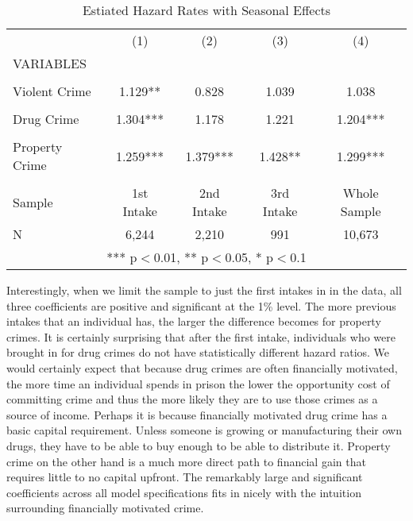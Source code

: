 \documentclass{article}
\begin{document}
\vspace{.25in}

\begin{table}[h!]
    \centering
\begin{tabular}{lcccc} \hline
 & (1) & (2) & (3) & (4) \\
VARIABLES &  &  &  &  \\ \hline
 &  &  &  &  \\
Violent Crime & 1.129** & 0.828 & 1.039 & 1.038 \\
 &  &  &  &  \\
Drug Crime & 1.304*** & 1.178 & 1.221 & 1.204*** \\
 &  &  &  &  \\
Property Crime & 1.259*** & 1.379*** & 1.428** & 1.299*** \\
 &  & & &  \\
 Sample & 1st Intake & 2nd Intake & 3rd Intake & Whole Sample \\
 N & 6,244 & 2,210 & 991 & 10,673 \\ \hline
\multicolumn{5}{c}{ *** p$<$0.01, ** p$<$0.05, * p$<$0.1} \\
\end{tabular}
    \caption{Estiated Hazard Rates with Seasonal Effects}
    \label{tab6}
\end{table}

Interestingly, when we limit the sample to just the first intakes in in the data, all three coefficients are positive and significant at the 1\% level. The more previous intakes that an individual has, the larger the difference becomes for property crimes. It is certainly surprising that after the first intake, individuals who were brought in for drug crimes do not have statistically different hazard ratios. We would certainly expect that because drug crimes are often financially motivated, the more time an individual spends in prison the lower the opportunity cost of committing crime and thus the  more likely they are to use those crimes as a source of income. Perhaps it is because financially motivated drug crime has a basic capital requirement. Unless someone is growing or manufacturing their own drugs, they have to be able to buy enough to be able to distribute it. Property crime on the other hand is a much more direct path to financial gain that requires little to no capital upfront. The remarkably large and significant coefficients across all model specifications fits in nicely with the intuition surrounding financially motivated crime. 
\end{document}
